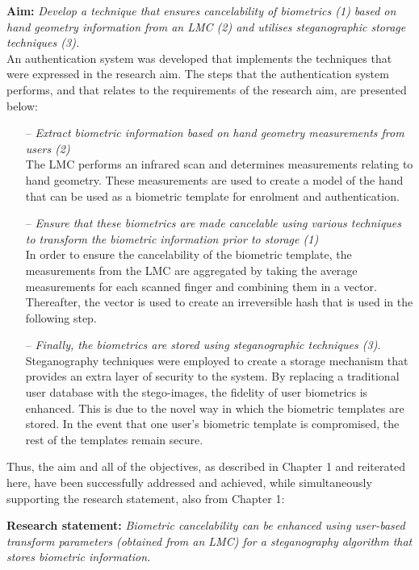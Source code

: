 \textbf{Aim:} \textit{Develop a technique that ensures cancelability of biometrics (1) based on hand geometry information from an LMC (2) and utilises steganographic storage techniques (3).}\\

An authentication system was developed that implements the techniques that were expressed in the research aim. The steps that the authentication system performs, and that relates to the requirements of the research aim, are presented below:

\begin{itemize}
    \item[--] \textit{Extract biometric information based on hand geometry measurements from users (2)}\\
    The LMC performs an infrared scan and determines measurements relating to hand geometry. These measurements are used to create a model of the hand that can be used as a biometric template for enrolment and authentication. 
    \pagebreak\item[--]  \textit{Ensure that these biometrics are made cancelable using various techniques to transform the biometric information prior to storage (1)}\\
    In order to ensure the cancelability of the biometric template, the measurements from the LMC are aggregated by taking the average measurements for each scanned finger and combining them in a vector. Thereafter, the vector is used to create an irreversible hash that is used in the following step.   
    \item[--] \textit{Finally, the biometrics  are stored using steganographic techniques (3).}\\
    Steganography techniques were employed to create a storage mechanism that provides an extra layer of security to the system. By replacing a traditional user database with the stego-images, the fidelity of user biometrics is enhanced. This is due to the novel way in which the biometric templates are stored. In the event that one user's biometric template is compromised, the rest of the templates remain secure.
\end{itemize}

Thus, the aim and all of the objectives, as described in Chapter 1 and reiterated here, have been successfully addressed and achieved, while simultaneously supporting the research statement, also from Chapter 1:  

\textbf{Research statement:} \textit{Biometric cancelability can be enhanced using user-based transform parameters (obtained from an LMC) for a steganography algorithm that stores biometric information.}

